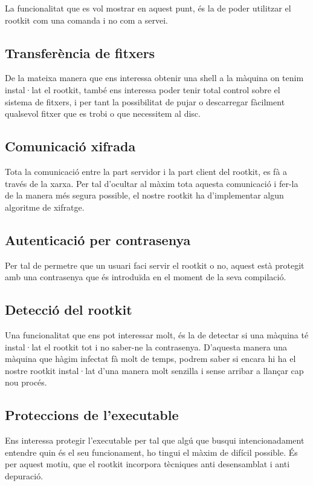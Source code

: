 La funcionalitat que es vol mostrar en aquest punt, és la de poder utilitzar el rootkit com una comanda i no com a servei.

\subsection{Transferència de fitxers}
De la mateixa manera que ens interessa obtenir una shell a la màquina on tenim instal·lat el rootkit, també ens interessa
poder tenir total control sobre el sistema de fitxers, i per tant la possibilitat de pujar o descarregar fàcilment 
qualsevol fitxer que es trobi o que necessitem al disc.

\subsection{Comunicació xifrada}
Tota la comunicació entre la part servidor i la part client del rootkit, es fà a través de la xarxa. Per tal d'ocultar al màxim 
tota aquesta comunicació i fer-la de la manera més segura possible, el nostre rootkit ha d'implementar algun algoritme de xifratge.

\subsection{Autenticació per contrasenya}
Per tal de permetre que un usuari faci servir el rootkit o no, aquest està protegit amb una contrasenya que és introduïda en el moment 
de la seva compilació.

\subsection{Detecció del rootkit}
Una funcionalitat que ens pot interessar molt, és la de detectar si una màquina té instal·lat el rootkit tot i no saber-ne la contrasenya. 
D'aquesta manera una màquina que hàgim infectat fà molt de temps, podrem saber si encara hi ha el nostre rootkit instal·lat d'una manera molt 
senzilla i sense arribar a llançar cap nou procés.

\subsection{Proteccions de l'executable}
Ens interessa protegir l'executable per tal que algú que busqui intencionadament entendre quin és el seu funcionament,
ho tingui el màxim de difícil possible. És per aquest motiu, que el rootkit incorpora tècniques anti desensamblat i anti depuració.

